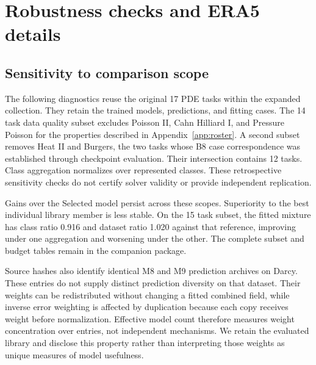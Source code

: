 \section{Robustness checks and ERA5 details}
\label{app:reanalysis}
\subsection{Sensitivity to comparison scope}
\label{app:subsets}
The following diagnostics reuse the original 17 PDE tasks within the expanded
collection. They retain the trained models, predictions, and fitting cases.
The 14 task data quality subset excludes Poisson II, Cahn Hilliard I, and
Pressure Poisson for the properties described in Appendix~\ref{app:roster}.
A second subset removes Heat II and Burgers, the two tasks whose B8 case
correspondence was established through checkpoint evaluation. Their intersection
contains 12 tasks. Class aggregation normalizes over represented classes.
These retrospective sensitivity checks do not certify solver validity or
provide independent replication.

\begin{table}[h!]
\centering\small\setlength{\tabcolsep}{3pt}
\caption{\textbf{Sensitivity to dataset inclusion.} Each cell gives the PDE
class ratio followed by the dataset ratio. $N$ counts tasks. Library and
baseline refer to retrospective best models after averaging partitions.
Both mixtures use five fitting examples.}
\label{tab:reviewsensitivity}
\resizebox{\linewidth}{!}{}
\end{table}

Gains over the Selected model persist across these scopes. Superiority to the
best individual library member is less stable. On the 15 task subset, the
fitted mixture has class ratio 0.916 and dataset ratio 1.020 against that
reference, improving under one aggregation and worsening under the other.
The complete subset and budget tables remain in the companion package.

Source hashes also identify identical M8 and M9 prediction archives on Darcy.
These entries do not supply distinct prediction diversity on that dataset.
Their weights can be redistributed without changing a fitted combined field,
while inverse error weighting is affected by duplication because each copy
receives weight before normalization. Effective model count therefore measures
weight concentration over entries, not independent mechanisms. We retain the
evaluated library and disclose this property rather than interpreting those
weights as unique measures of model usefulness.

